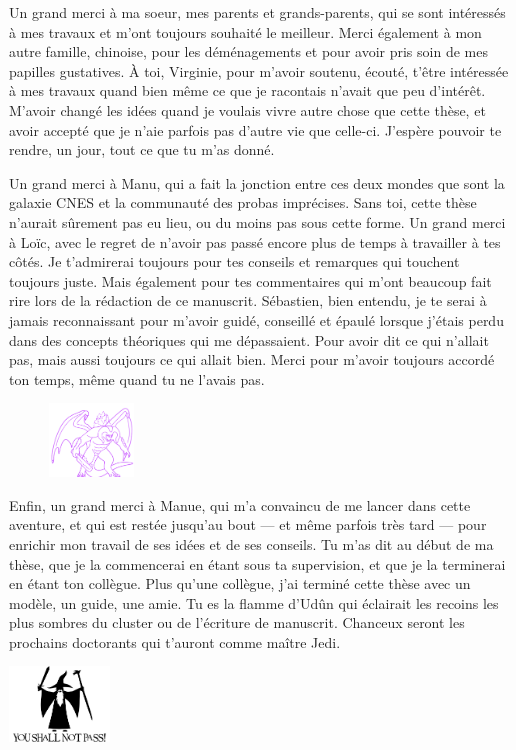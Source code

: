 Un grand merci à ma soeur, mes parents et grands-parents, qui se sont intéressés à mes travaux et m’ont toujours souhaité le meilleur. Merci également à mon autre famille, chinoise, pour les déménagements et pour avoir pris soin de mes papilles gustatives. À toi, Virginie, pour m’avoir soutenu, écouté, t’être intéressée à mes travaux quand bien même ce que je racontais n’avait que peu d’intérêt. M’avoir changé les idées quand je voulais vivre autre chose que cette thèse, et avoir accepté que je n’aie parfois pas d’autre vie que celle-ci. J'espère pouvoir te rendre, un jour, tout ce que tu m'as donné.

Un grand merci à Manu, qui a fait la jonction entre ces deux mondes que sont la galaxie CNES et la communauté des probas imprécises. Sans toi, cette thèse n'aurait sûrement pas eu lieu, ou du moins pas sous cette forme. Un grand merci à Loïc, avec le regret de n'avoir pas passé encore plus de temps à travailler à tes côtés. Je t'admirerai toujours pour tes conseils et remarques qui touchent toujours juste. Mais également pour tes commentaires qui m'ont beaucoup fait rire lors de la rédaction de ce manuscrit. Sébastien, bien entendu, je te serai à jamais reconnaissant pour m'avoir guidé, conseillé et épaulé lorsque j'étais perdu dans des concepts théoriques qui me dépassaient. Pour avoir dit ce qui n'allait pas, mais aussi toujours ce qui allait bien. Merci pour m'avoir toujours accordé ton temps, même quand tu ne l'avais pas.

\begin{figure}
  \begin{center}
    \includegraphics[width=0.2\textwidth]{tmp/balrog.png}
  \end{center}
\end{figure}
Enfin, un grand merci à Manue, qui m’a convaincu de me lancer dans cette aventure, et qui est restée jusqu’au bout — et même parfois très tard — pour enrichir mon travail de ses idées et de ses conseils. Tu m’as dit au début de ma thèse, que je la commencerai en étant sous ta supervision, et que je la terminerai en étant ton collègue. Plus qu’une collègue, j’ai terminé cette thèse avec un modèle, un guide, une amie. Tu es la flamme d’Udûn qui éclairait les recoins les plus sombres du cluster ou de l’écriture de manuscrit. Chanceux seront les prochains doctorants qui t’auront comme maître Jedi.
\begin{center}
    \includegraphics[width=0.2\textwidth]{tmp/gandalf.png}
\end{center}
\clearpage